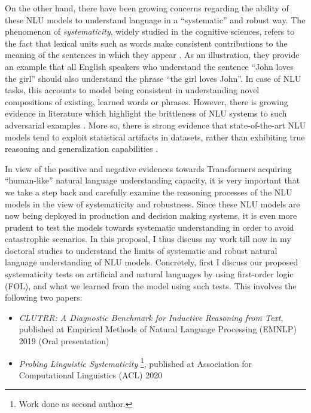 \documentclass[12pt]{article}
\begin{document}
On the other hand, there have been growing concerns regarding the ability of these NLU models to understand language in a ``systematic'' and robust way. The phenomenon of \textit{systematicity}, widely studied in the cognitive sciences, refers to the fact that lexical units such as words make consistent contributions to the meaning of the sentences in which they appear \CITE[Fodor]. As an illustration, they provide an example that all English speakers who understand the sentence ``John loves the girl'' should also understand the phrase ``the girl loves John''. In case of NLU tasks, this accounts to model being consistent in understanding novel compositions of existing, learned words or phrases. However, there is growing evidence in literature which highlight the brittleness of NLU systems to such adversarial examples \CITE. More so, there is strong evidence that state-of-the-art NLU models tend to exploit statistical artifacts in datasets, rather than exhibiting true reasoning and generalization capabilities \CITE.

In view of the positive and negative evidences towards Transformers acquiring ``human-like'' natural language understanding capacity, it is very important that we take a step back and carefully examine the reasoning processes of the NLU models in the view of systematicity and robustness. Since these NLU models are now being deployed in production and decision making systems, it is even more prudent to test the models towards systematic understanding in order to avoid catastrophic scenarios. In this proposal, I thus discuss my work till now in my doctoral studies to understand the limits of systematic and robust natural language understanding of NLU models. Concretely, first I discuss our proposed systematicity tests on artificial and natural languages by using first-order logic (FOL), and what we learned from the model using such tests. This involves the following two papers:

\begin{itemize}
  \item \textit{CLUTRR: A Diagnostic Benchmark for Inductive Reasoning from Text}, published at Empirical Methods of Natural Language Processing (EMNLP) 2019 (Oral presentation) \cite{sinha2019a}
  \item \textit{Probing Linguistic Systematicity} \footnote{Work done as second author.}, published at Association for Computational Linguistics (ACL) 2020 \cite{goodwin2020}
\end{itemize}
\end{document}
